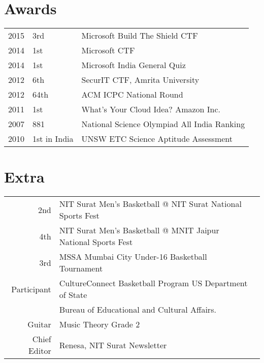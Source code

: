 \documentclass[]{single-page-resume}
\begin{document}
\begin{minipage}[t]{0.66\textwidth}
\descript{ }
\sectionsep

\descript{}
\sectionsep

\descript{}
\sectionsep


\section{Awards} 
\begin{tabular}{rll}
2015	     & 3rd  & Microsoft Build The Shield CTF\\
2014	     & 1st  & Microsoft CTF\\
2014     & 1st & Microsoft India General Quiz\\
2012	     & 6th  & SecurIT CTF, Amrita University\\
2012	     & 64th  & ACM ICPC National Round\\
2011     & 1st & What's Your Cloud Idea? Amazon Inc.\\
2007     & 881 & National Science Olympiad All India Ranking \\
2010     & 1st in India & UNSW ETC Science Aptitude Assessment\\
\end{tabular}
\sectionsep


\section{Extra} 

\begin{tabular}{rll}
2nd    & NIT Surat Men's Basketball @ NIT Surat National Sports Fest\\
4th   & NIT Surat Men's Basketball @ MNIT Jaipur National Sports Fest\\
3rd  & MSSA Mumbai City Under-16 Basketball Tournament\\
Participant & CultureConnect Basketball Program US Department of State\\
& Bureau of Educational and Cultural Affairs. \\
Guitar & Music Theory Grade 2 \\
Chief Editor & Renesa, NIT Surat Newsletter\\
\end{tabular}
\sectionsep

\end{minipage} 
\end{document}

